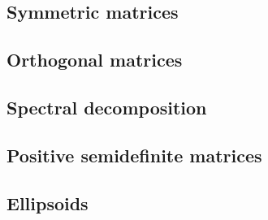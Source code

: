 \subsection{Symmetric matrices}
\subsection{Orthogonal matrices}
\subsection{Spectral decomposition}
\subsection{Positive semidefinite matrices}
\subsection{Ellipsoids}